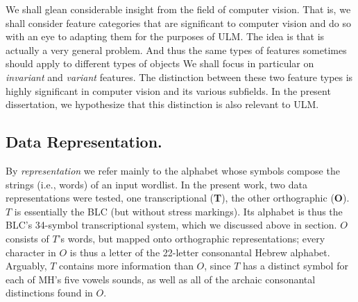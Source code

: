 We shall glean considerable insight
from the field of computer vision. That is, we shall consider feature categories that 
are significant to computer vision and do so with an eye to adapting them for the purposes of \ac{ULM}. The idea is that 
is actually a very general problem. And thus the
same types of features sometimes should apply to different types of objects
We shall focus in particular on \emph{invariant} and \emph{variant} features. 
The distinction between these two feature types is highly significant in
computer vision and its various subfields. In the present dissertation, we hypothesize that this distinction is
also relevant to ULM. 


\subsection {Data Representation.} 
By \emph{representation} we refer mainly to the alphabet whose symbols compose the strings (i.e., words) 
of an input wordlist.
In the present work, two data representations were tested, one transcriptional 
(\textbf{T}), the other orthographic (\textbf{O}). 
$T$ is essentially the \ac{BLC} (but without stress markings). Its alphabet is thus the \ac{BLC}'s 34-symbol
transcriptional system, which we discussed above in section. %
$O$ consists of $T$'s words, but mapped onto orthographic representations; every character in $O$ is thus
a letter of the 22-letter consonantal Hebrew alphabet.
Arguably, $T$ contains more information than $O$,
since $T$ has a distinct symbol for each of \ac{MH}'s five vowels sounds, %
as well as all of the archaic consonantal distinctions found in $O$. 

